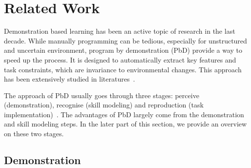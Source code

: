 \section{Related Work}
\label{sec:related}


Demonstration based learning has been an active topic of research in the last decade. While manually programming can be tedious, especially for unstructured and uncertain environment, program by demonstration (PbD) provide a way to speed up the process. It is designed to automatically extract key features and task constraints, which are invariance to environmental changes. This approach has been extensively studied in literatures~\cite{calinon2007learning,dillmann2004teaching,kulic2012incremental}.

The approach of PbD usually goes through three stages: perceive (demonstration), recognise (skill modeling) and reproduction (task implementation)~\cite{demiris2002f}. The advantages of PbD largely come from the demonstration and skill modeling steps. In the later part of this section, we provide an overview on these two stages.

\subsection{Demonstration}

